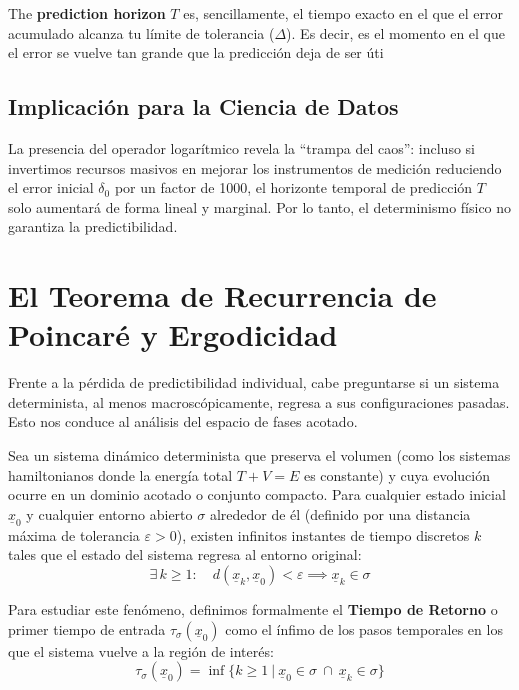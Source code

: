\begin{definicion}
    The \textbf{prediction horizon} $T$ es, sencillamente, el tiempo exacto en el que el error acumulado alcanza tu límite de tolerancia ($\Delta$). Es decir, es el momento en el que el error se vuelve tan grande que la predicción deja de ser úti
\end{definicion}

\subsection*{Implicación para la Ciencia de Datos}
La presencia del operador logarítmico revela la ``trampa del caos'': incluso si invertimos recursos masivos en mejorar los instrumentos de medición reduciendo el error inicial $\delta_0$ por un factor de 1000, el horizonte temporal de predicción $T$ solo aumentará de forma lineal y marginal. Por lo tanto, el determinismo físico no garantiza la predictibilidad.


\section{El Teorema de Recurrencia de Poincaré y Ergodicidad}

Frente a la pérdida de predictibilidad individual, cabe preguntarse si un sistema determinista, al menos macroscópicamente, regresa a sus configuraciones pasadas. Esto nos conduce al análisis del espacio de fases acotado.

\begin{teo}
Sea un sistema dinámico determinista que preserva el volumen (como los sistemas hamiltonianos donde la energía total $T+V=E$ es constante) y cuya evolución ocurre en un dominio acotado o conjunto compacto. Para cualquier estado inicial $\underline{x}_0$ y cualquier entorno abierto $\sigma$ alrededor de él (definido por una distancia máxima de tolerancia $\varepsilon > 0$), existen infinitos instantes de tiempo discretos $k$ tales que el estado del sistema regresa al entorno original:
\begin{equation}
    \exists \, k \geq 1 : \quad d(\underline{x}_k, \underline{x}_0) < \varepsilon \implies \underline{x}_k \in \sigma
\end{equation}
\end{teo}

Para estudiar este fenómeno, definimos formalmente el \textbf{Tiempo de Retorno} o primer tiempo de entrada $\tau_\sigma(\underline{x}_0)$ como el ínfimo de los pasos temporales en los que el sistema vuelve a la región de interés:
\begin{equation}
    \tau_\sigma(\underline{x}_0) = \inf \big\{ k \geq 1 \ \big| \ \underline{x}_0 \in \sigma \ \cap \ \underline{x}_k \in \sigma \big\}
\end{equation}

